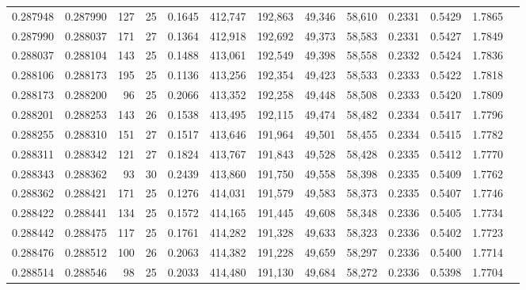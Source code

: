 \begin{tabular}{rrrrrrrrrrrrr}
0.287948 & 0.287990 &   127 &  25 &                                     0.1645 & 412,747 & 192,863 &  49,346 &  58,610 & 0.2331 & 0.5429 & 1.7865 \\
0.287990 & 0.288037 &   171 &  27 &                                     0.1364 & 412,918 & 192,692 &  49,373 &  58,583 & 0.2331 & 0.5427 & 1.7849 \\
0.288037 & 0.288104 &   143 &  25 &                                     0.1488 & 413,061 & 192,549 &  49,398 &  58,558 & 0.2332 & 0.5424 & 1.7836 \\
0.288106 & 0.288173 &   195 &  25 &                                     0.1136 & 413,256 & 192,354 &  49,423 &  58,533 & 0.2333 & 0.5422 & 1.7818 \\
0.288173 & 0.288200 &    96 &  25 &                                     0.2066 & 413,352 & 192,258 &  49,448 &  58,508 & 0.2333 & 0.5420 & 1.7809 \\
0.288201 & 0.288253 &   143 &  26 &                                     0.1538 & 413,495 & 192,115 &  49,474 &  58,482 & 0.2334 & 0.5417 & 1.7796 \\
0.288255 & 0.288310 &   151 &  27 &                                     0.1517 & 413,646 & 191,964 &  49,501 &  58,455 & 0.2334 & 0.5415 & 1.7782 \\
0.288311 & 0.288342 &   121 &  27 &                                     0.1824 & 413,767 & 191,843 &  49,528 &  58,428 & 0.2335 & 0.5412 & 1.7770 \\
0.288343 & 0.288362 &    93 &  30 &                                     0.2439 & 413,860 & 191,750 &  49,558 &  58,398 & 0.2335 & 0.5409 & 1.7762 \\
0.288362 & 0.288421 &   171 &  25 &                                     0.1276 & 414,031 & 191,579 &  49,583 &  58,373 & 0.2335 & 0.5407 & 1.7746 \\
0.288422 & 0.288441 &   134 &  25 &                                     0.1572 & 414,165 & 191,445 &  49,608 &  58,348 & 0.2336 & 0.5405 & 1.7734 \\
0.288442 & 0.288475 &   117 &  25 &                                     0.1761 & 414,282 & 191,328 &  49,633 &  58,323 & 0.2336 & 0.5402 & 1.7723 \\
0.288476 & 0.288512 &   100 &  26 &                                     0.2063 & 414,382 & 191,228 &  49,659 &  58,297 & 0.2336 & 0.5400 & 1.7714 \\
0.288514 & 0.288546 &    98 &  25 &                                     0.2033 & 414,480 & 191,130 &  49,684 &  58,272 & 0.2336 & 0.5398 & 1.7704 \\

\end{tabular}
